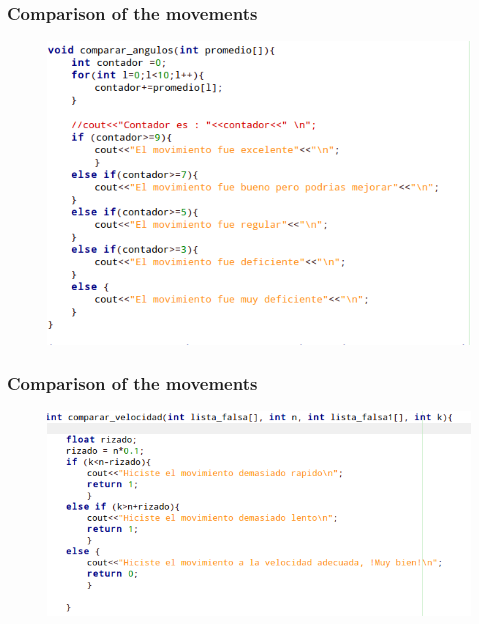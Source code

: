 \documentclass{beamer}
\begin{document}
\begin{frame}
\frametitle{Comparison of the movements}

\begin{figure}
\includegraphics[width=0.7\linewidth]{24.png}
\end{figure}


\end{frame}


\begin{frame}
\frametitle{Comparison of the movements}

\begin{figure}
\includegraphics[width=0.7\linewidth]{25.png}
\end{figure}


\end{frame}


\end{document}
